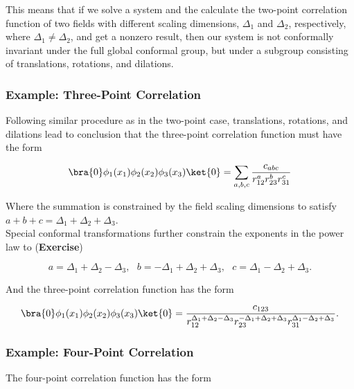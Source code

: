 \noindent This means that if we solve a system and the calculate the two-point correlation function of two fields with different scaling dimensions, $\Delta_1$ and $\Delta_2$, respectively, where $\Delta_1 \ne \Delta_2$, and get a nonzero result, then our system is not conformally invariant under the full global conformal group, but under a subgroup consisting of translations, rotations, and dilations. \\

\subsubsection*{Example: Three-Point Correlation}

\noindent Following similar procedure as in the two-point case, translations, rotations, and dilations lead to conclusion that the three-point correlation function must have the form

\begin{equation}
\bra{0} \phi_1 (x_1) \phi_2 (x_2) \phi_3 (x_3) \ket{0} = \sum_{a,b,c} \frac{c_{abc}}{r_{12}^a r_{23}^b r_{31}^c}
\end{equation}

\noindent Where the summation is constrained by the field scaling dimensions to satisfy $a+b+c = \Delta_1 + \Delta_2 + \Delta_3$. \\

\noindent Special conformal transformations further constrain the exponents in the power law to (\textbf{Exercise})

\begin{equation}
a = \Delta_1 + \Delta_2 - \Delta_3, \,\,\,\, b = -\Delta_1 + \Delta_2 + \Delta_3, \,\,\,\, c = \Delta_1 - \Delta_2 + \Delta_3.
\end{equation}

\noindent And the three-point correlation function has the form

\begin{equation}
\bra{0} \phi_1 (x_1) \phi_2 (x_2) \phi_3 (x_3) \ket{0} = \frac{c_{123}}{r_{12}^{\Delta_1 + \Delta_2 - \Delta_3} r_{23}^{-\Delta_1 + \Delta_2 + \Delta_3} r_{31}^{\Delta_1 - \Delta_2 + \Delta_3}}.
\end{equation}

\subsubsection*{Example: Four-Point Correlation}

\noindent The four-point correlation function has the form


